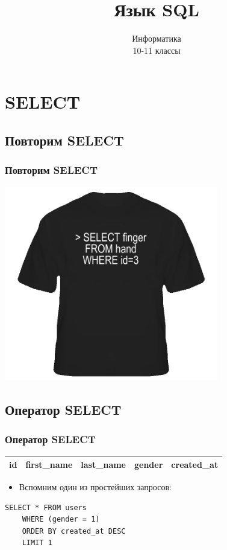 \documentclass[compress,red]{beamer}
\title{Язык SQL}
\author{Информатика \\ 10-11 классы}
\begin{document}
\maketitle

\section{SELECT}

\subsection{Повторим SELECT}
\begin{frame}[fragile]
  \frametitle{Повторим SELECT}
  \centerline{\includegraphics[width=0.7\textwidth]{images/tshirt.png}}
\end{frame}

\subsection{Оператор SELECT}
\begin{frame}[fragile]
  \frametitle{Оператор SELECT}
  \begin{tabular}{|c|c|c|c|c|}
  \hline
  id & first\_name & last\_name & gender & created\_at\\
  \hline
  \end{tabular}
  \begin{itemize}
    \item Вспомним один из простейших запросов:
  \end{itemize}
  \scriptsize{
  \begin{lstlisting}[label=sql1, caption=SELECT]
    SELECT * FROM users
    WHERE (gender = 1)
    ORDER BY created_at DESC
    LIMIT 1
  \end{lstlisting}
  }
\end{frame}
\end{document}
